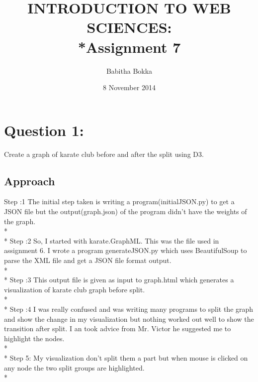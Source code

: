 \documentclass[12pt]{article}
\begin{document}
\begin{titlepage}
\title{INTRODUCTION TO WEB SCIENCES:\\*Assignment 7}
\author{Babitha Bokka}
\date{8 November 2014}
\maketitle
\end{titlepage}

\tableofcontents
\newpage
\section{Question 1:}
Create a graph of karate club before and after the split using D3.
\subsection{Approach}
 Step :1 The initial step taken is writing a program(initialJSON.py) to get a JSON file but the output(graph.json) of the program didn't have the weights of the graph.\\*\\*
Step :2  So, I started with karate.GraphML. This was the file used in assignment 6. I wrote a program generateJSON.py which uses BeautifulSoup to parse the XML file and get a JSON file format output.\\*\\*
Step :3  This output file is given as input to graph.html which generates a visualization of karate club graph before split.\\*\\*
Step :4 I was really confused and was writing many programs to split the graph and show the change in my visualization but nothing worked out well to show the  transition after split. I an took advice from Mr. Victor he suggested me to highlight the nodes.\\*\\*
Step 5: My visualization don't split them a part but when mouse is clicked on any node the two split groups are highlighted. \\*
\end{document}
